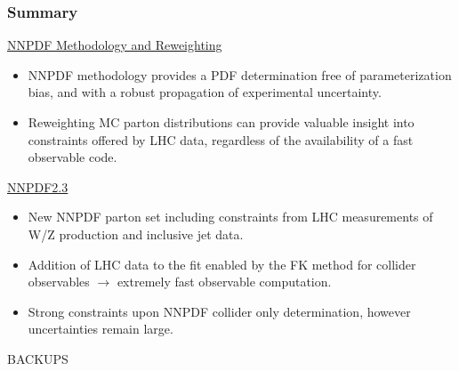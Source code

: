 \documentclass[10pt]{beamer}
\begin{document}
\begin{frame}
\frametitle{Summary}

\underline{NNPDF Methodology and Reweighting} \vskip5pt
\begin{itemize} \small
\item<1-> NNPDF methodology provides a PDF determination free of parameterization bias, and with a robust propagation of experimental uncertainty.
\item<1-> Reweighting MC parton distributions can provide valuable insight into constraints offered by LHC data, regardless of the availability of a fast observable code.
\end{itemize}
\vskip20pt
\underline{NNPDF2.3} \vskip5pt
\begin{itemize} \small
\item<1-> New NNPDF parton set including constraints from LHC measurements of W/Z production and inclusive jet data.
\item<1-> Addition of LHC data to the fit enabled by the FK method for collider observables $\to$ extremely fast observable computation.
\item<1-> Strong constraints upon NNPDF collider only determination, however uncertainties remain large.
\end{itemize}
\end{frame}


\begin{frame}
    \begin{center}
      BACKUPS
    \end{center}
\end{frame}
\end{document}
